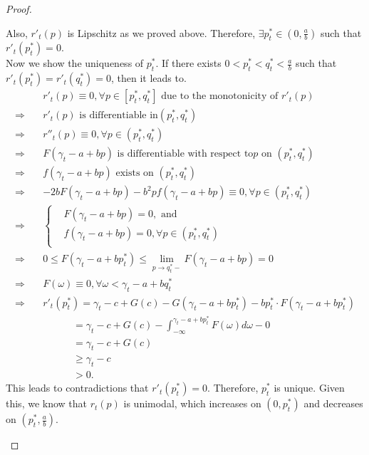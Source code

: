 \begin{proof}
\begin{enumerate}
    Also, $r'_t(p)$ is Lipschitz as we proved above. Therefore, $\exists p_t^*\in(0, \frac{a}{b})$ such that $r'_t(p_t^*)=0$.
    \\
    Now we show the uniqueness of $p_t^*$. If there exists $0<p_t^*<q_t^*<\frac{a}{b}$ such that $r'_t(p_t^*) = r'_t(q_t^*)=0$, then it leads to.
    \begin{equation}
        \label{eq:uniqueness_p_t^*}
        \begin{aligned}
            &r'_t(p)\equiv 0, \forall p\in[p_t^*, q_t^*] \text{ due to the monotonicity of }r'_t(p)\\
            \Rightarrow\quad&r'_t(p)\text{ is differentiable in} (p_t^*, q_t^*)\\
            \Rightarrow\quad&r''_t(p)\equiv 0 , \forall p\in (p_t^*, q_t^*)\\
            \Rightarrow\quad&F(\gamma_t-a+bp)\text{ is differentiable with respect to} p \text{ on }(p_t^*, q_t^*)\\
            \Rightarrow\quad&f(\gamma_t-a+bp)\text{ exists on }(p_t^*, q_t^*)\\
            \Rightarrow\quad&-2bF(\gamma_t-a+bp)-b^2pf(\gamma_t-a+bp)\equiv0, \forall p\in(p_t^*, q_t^*)\\
            \Rightarrow\quad&\left\{
            \begin{aligned}
            &F(\gamma_t-a+bp)=0,\text{ and}\\
            &f(\gamma_t-a+bp)=0, \forall p\in(p_t^*, q_t^*)\\
            \end{aligned}
            \right.\\
            \Rightarrow\quad&0\leq F(\gamma_t-a+bp_t^*)\leq \lim_{p\rightarrow q_t^*-}F(\gamma_t-a+bp)=0\\
            \Rightarrow\quad& F(\omega)\equiv 0, \forall\omega<\gamma_t-a+bq_t^*\\
            \Rightarrow\quad&r'_t(p_t^*)=\gamma_t-c+G(c)-G(\gamma_t-a+bp_t^*)-bp_t^*\cdot F(\gamma_t-a+bp_t^*)\\
            &\qquad\quad=\gamma_t-c+G(c)-\int_{-\infty}^{\gamma_t-a+bp_t^*}F(\omega)d\omega-0\\
            &\qquad\quad=\gamma_t-c+G(c)\\
            &\qquad\quad\geq\gamma_t-c\\
            &\qquad\quad>0.
        \end{aligned}
    \end{equation}
    This leads to contradictions that $r'_t(p_t^*)=0$. Therefore, $p_t^*$ is unique. Given this, we know that $r_t(p)$ is unimodal, which increases on $(0, p_t^*)$ and decreases on $(p_t^*, \frac{a}{b})$.

\end{enumerate}
\end{proof}
